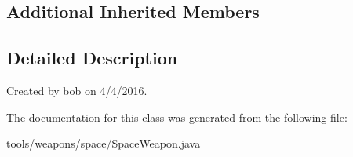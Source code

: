 \subsection*{Additional Inherited Members}


\subsection{Detailed Description}
Created by bob on 4/4/2016. 

The documentation for this class was generated from the following file\+:\begin{DoxyCompactItemize}
\item 
tools/weapons/space/Space\+Weapon.\+java\end{DoxyCompactItemize}
